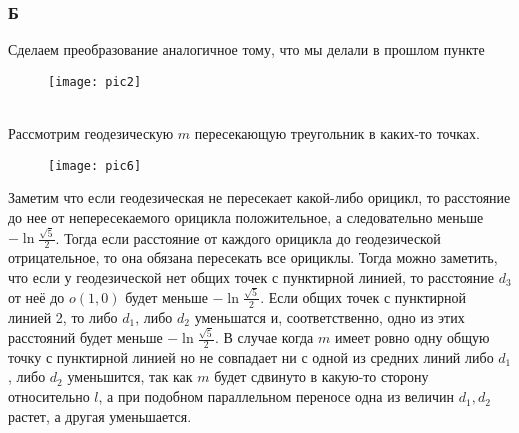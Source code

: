 		
		
		\newpage
		\subsubsection*{\textbf{Б}}
		Сделаем преобразование аналогичное тому, что мы делали в прошлом пункте\\
		\begin{figure}[h]
			\texttt{[image: pic2]}
		\end{figure}\\
		\noindent 
		Рассмотрим геодезическую $m$ пересекающую треугольник в каких-то точках.\\
		\begin{figure}[h]
			\texttt{[image: pic6]}
		\end{figure}
		\noindent
		Заметим что если геодезическая не пересекает какой-либо орицикл, то расстояние до нее от непересекаемого орицикла положительное, а следовательно меньше $-\ln\frac{\sqrt{5}}{2}$. Тогда если расстояние от каждого орицикла до геодезической отрицательное, то она обязана пересекать все орициклы. Тогда можно заметить, что если у геодезической нет общих точек с пунктирной линией, то расстояние $d_3$ от неё до $o(1,0)$ будет меньше $-\ln\frac{\sqrt{5}}{2}$. Если общих точек с пунктирной линией 2, то либо $d_1$, либо $d_2$ уменьшатся и, соответственно, одно из этих расстояний будет меньше $-\ln\frac{\sqrt{5}}{2}$. В случае когда $m$ имеет ровно одну общую точку с пунктирной линией но не совпадает ни с одной из средних линий либо $d_1$, либо $d_2$ уменьшится, так как $m$ будет сдвинуто в какую-то сторону относительно $l$, а при подобном параллельном переносе одна из величин $d_1,d_2$ растет, а другая уменьшается. 
		
		
		
		\newpage
